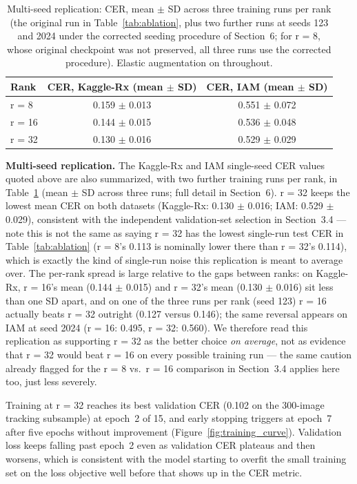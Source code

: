 \documentclass[12pt]{article}
\begin{document}
\begin{table}[ht]
\centering
\caption{Multi-seed replication: CER, mean $\pm$ SD across three training runs per rank (the original run
in Table~\ref{tab:ablation}, plus two further runs at seeds 123 and 2024 under the corrected seeding
procedure of Section~6; for r = 8, whose original checkpoint was not preserved, all three runs use the
corrected procedure). Elastic augmentation on throughout.}
\label{tab:seedsweep}
\small
\begin{tabular}{lcc}
\toprule
Rank & CER, Kaggle-Rx (mean $\pm$ SD) & CER, IAM (mean $\pm$ SD) \\
\midrule
r = 8  & 0.159 $\pm$ 0.013 & 0.551 $\pm$ 0.072 \\
r = 16 & 0.144 $\pm$ 0.015 & 0.536 $\pm$ 0.048 \\
r = 32 & 0.130 $\pm$ 0.016 & 0.529 $\pm$ 0.029 \\
\bottomrule
\end{tabular}
\end{table}

\textbf{Multi-seed replication.} The Kaggle-Rx and IAM single-seed CER values quoted above are also
summarized, with two further training runs per rank, in Table~\ref{tab:seedsweep} (mean $\pm$ SD across
three runs; full detail in Section~6). r = 32 keeps the lowest mean CER on both datasets (Kaggle-Rx: 0.130
$\pm$ 0.016; IAM: 0.529 $\pm$ 0.029), consistent with the independent validation-set selection in
Section~3.4 --- note this is not the same as saying r = 32 has the lowest single-run test CER in
Table~\ref{tab:ablation} (r = 8's 0.113 is nominally lower there than r = 32's 0.114), which is exactly the
kind of single-run noise this replication is meant to average over. The per-rank spread is large relative to
the gaps between ranks: on Kaggle-Rx, r = 16's mean (0.144 $\pm$ 0.015) and r = 32's mean (0.130 $\pm$ 0.016)
sit less than one SD apart, and on one of the three runs per rank (seed 123) r = 16 actually beats r = 32
outright (0.127 versus 0.146); the same reversal appears on IAM at seed 2024 (r = 16: 0.495, r = 32: 0.560).
We therefore read this replication as supporting r = 32 as the better choice \textit{on average}, not as
evidence that r = 32 would beat r = 16 on every possible training run --- the same caution already flagged
for the r = 8 vs.\ r = 16 comparison in Section~3.4 applies here too, just less severely.

Training at r = 32 reaches its best validation CER (0.102 on the 300-image tracking subsample) at epoch~2 of
15, and early stopping triggers at epoch~7 after five epochs without improvement
(Figure~\ref{fig:training_curve}). Validation loss keeps falling past epoch~2 even as validation CER
plateaus and then worsens, which is consistent with the model starting to overfit the small training set on
the loss objective well before that shows up in the CER metric.
\end{document}
